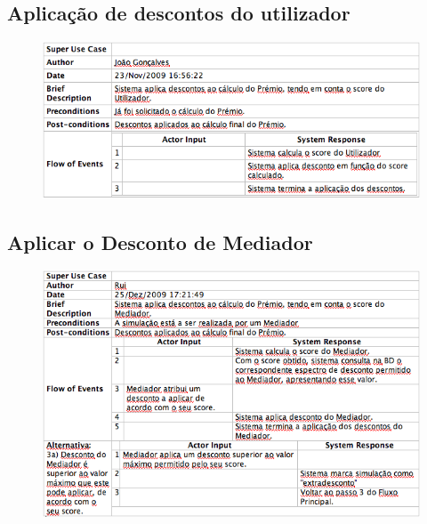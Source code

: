 \subsection{Aplicação de descontos do utilizador}
\begin{figure}[!htb]
	\centering
	\includegraphics[scale=0.65]{images/Prints/RealizacaoSeguroSaude/AplicarDescontoUtilizador.png}
\end{figure}

\subsection{Aplicar o Desconto de Mediador}
\begin{figure}[!htb]
	\centering
	\includegraphics[scale=0.70]{images/Prints/RealizacaoSeguroSaude/AplicarDescontoMediador.png}
\end{figure}

\pagebreak

